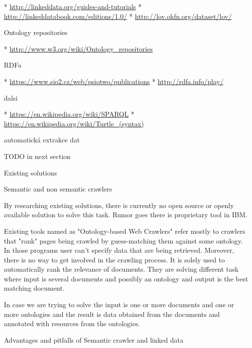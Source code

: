 \begitems
 * \url{http://linkeddata.org/guides-and-tutorials}
 * \url{http://linkeddatabook.com/editions/1.0/}
 * \url{http://lov.okfn.org/dataset/lov/}
\enditems


\sec Ontology repositories

\begitems
 * \url{http://www.w3.org/wiki/Ontology_repositories}
\enditems


\sec RDFa

\begitems
 * \url{https://www.sio2.cz/web/psiotwo/publications}
 * \url{http://rdfa.info/play/}
\enditems


\sec dalsi

\begitems
 * \url{https://en.wikipedia.org/wiki/SPARQL}
 * \url{https://en.wikipedia.org/wiki/Turtle_(syntax)}
\enditems



\sec automatická extrakce dat

TODO in next section














\chap Existing solutions


\sec Semantic and non semantic crawlers

By researching existing solutions, there is currently no open source or openly
available solution to solve this task. Rumor goes there is proprietary tool in IBM.

Existing tools named as "Ontology-based Web Crawlers" refer mostly to crawlers
that "rank" pages being crawled by guess-matching them against some ontology.
In those programs user can't specify data that are being retrieved. Moreover,
there is no way to get involved in the crawling process. It is solely used to
automatically rank the relevance of documents. They are solving different task
where input is several documents and possibly an ontology and output is the
best matching document. 

In case we are trying to solve the input is one or more documents and one or
more ontologies and the result is data obtained from the documents and
annotated with resources from the ontologies. 

\sec Advantages and pitfalls of Semantic crawler and linked data


